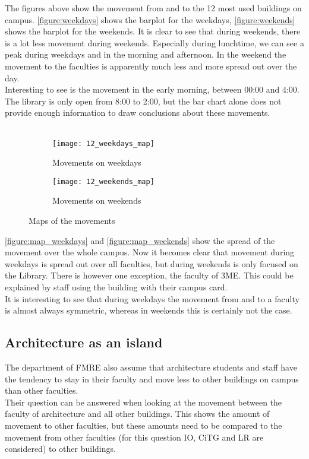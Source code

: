 The figures above show the movement from and to the 12 most used buildings on campus. \autoref{figure:weekdays} shows the barplot for the weekdays, \autoref{figure:weekends} shows the barplot for the weekends. It is clear to see that during weekends, there is a lot less movement during weekends. Especially during lunchtime, we can see a peak during weekdays and in the morning and afternoon. In the weekend the movement to the faculties is apparently much less and more spread out over the day.\\
Interesting to see is the movement in the early morning, between 00:00 and 4:00. The library is only open from 8:00 to 2:00, but the bar chart alone does not provide enough information to draw conclusions about these movements.\\\\
\begin{figure}[H]
	\captionsetup[subfigure]{justification=centering}
	\begin{subfigure}[t]{0.48\textwidth}
	\texttt{[image: 12\_weekdays\_map]}
	\caption{Movements on weekdays}
	\label{figure:map_weekdays}
	\end{subfigure}
	\begin{subfigure}[t]{0.48\textwidth}
	\texttt{[image: 12\_weekends\_map]}
	\caption{Movements on weekends}
	\label{figure:map_weekends}
	\end{subfigure}
	\captionsetup{justification=centering}
	\caption{Maps of the movements}
\end{figure}
\autoref{figure:map_weekdays} and \autoref{figure:map_weekends} show the spread of the movement over the whole campus. Now it becomes clear that movement during weekdays is spread out over all faculties, but during weekends is only focused on the Library. There is however one exception, the faculty of 3ME. This could be explained by staff using the building with their campus card. \\

It is interesting to see that during weekdays the movement from and to a faculty is almost always symmetric, whereas in weekends this is certainly not the case. 

\subsection{Architecture as an island}
The department of FMRE also assume that architecture students and staff have the tendency to stay in their faculty and move less to other buildings on campus than other faculties. \\
Their question can be answered when looking at the movement between the faculty of architecture and all other buildings. This shows the amount of movement to other faculties, but these amounts need to be compared to the movement from other faculties (for this question IO, CiTG and LR are considered) to other buildings. \\

